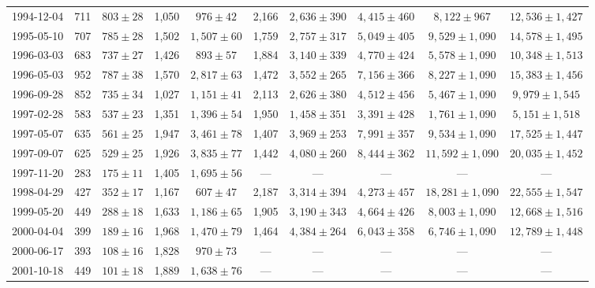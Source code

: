 \begin{landscape}
\begin{longtable}{cccccccccc}
{1994-12-04} & 711 & {$803  \pm  28$} & 1,050 & {$976 \pm 42$} & 2,166 & {$2,636 \pm 390$} & {$4,415 \pm 460$} & {$8,122 \pm 967$} & {$12,536 \pm 1,427$} \\
{1995-05-10} & 707 & {$785  \pm  28$} & 1,502 & {$1,507 \pm 60$} & 1,759 & {$2,757 \pm 317$} & {$5,049 \pm 405$} & {$9,529 \pm 1,090$} & {$14,578 \pm 1,495$} \\
{1996-03-03} & 683 & {$737  \pm  27$} & 1,426 & {$893 \pm 57$} & 1,884 & {$3,140 \pm 339$} & {$4,770 \pm 424$} & {$5,578 \pm 1,090$} & {$10,348 \pm 1,513$} \\
{1996-05-03} & 952 & {$787  \pm  38$} & 1,570 & {$2,817 \pm 63$} & 1,472 & {$3,552 \pm 265$} & {$7,156 \pm 366$} & {$8,227 \pm 1,090$} & {$15,383 \pm 1,456$} \\
{1996-09-28} & 852 & {$735  \pm  34$} & 1,027 & {$1,151 \pm 41$} & 2,113 & {$2,626 \pm 380$} & {$4,512 \pm 456$} & {$5,467 \pm 1,090$} & {$9,979 \pm 1,545$} \\
{1997-02-28} & 583 & {$537  \pm  23$} & 1,351 & {$1,396 \pm 54$} & 1,950 & {$1,458 \pm 351$} & {$3,391 \pm 428$} & {$1,761 \pm 1,090$} & {$5,151 \pm 1,518$} \\
{1997-05-07} & 635 & {$561  \pm  25$} & 1,947 & {$3,461 \pm 78$} & 1,407 & {$3,969 \pm 253$} & {$7,991 \pm 357$} & {$9,534 \pm 1,090$} & {$17,525 \pm 1,447$} \\
{1997-09-07} & 625 & {$529  \pm  25$} & 1,926 & {$3,835 \pm 77$} & 1,442 & {$4,080 \pm 260$} & {$8,444 \pm 362$} & {$11,592 \pm 1,090$} & {$20,035 \pm 1,452$} \\
{1997-11-20} & 283 & {$175  \pm  11$} & 1,405 & {$1,695 \pm 56$} & --- & --- & --- & --- & --- \\
{1998-04-29} & 427 & {$352  \pm  17$} & 1,167 & {$607 \pm 47$} & 2,187 & {$3,314 \pm 394$} & {$4,273 \pm 457$} & {$18,281 \pm 1,090$} & {$22,555 \pm 1,547$} \\
{1999-05-20} & 449 & {$288  \pm  18$} & 1,633 & {$1,186 \pm 65$} & 1,905 & {$3,190 \pm 343$} & {$4,664 \pm 426$} & {$8,003 \pm 1,090$} & {$12,668 \pm 1,516$} \\
{2000-04-04} & 399 & {$189  \pm  16$} & 1,968 & {$1,470 \pm 79$} & 1,464 & {$4,384 \pm 264$} & {$6,043 \pm 358$} & {$6,746 \pm 1,090$} & {$12,789 \pm 1,448$} \\
{2000-06-17} & 393 & {$108  \pm  16$} & 1,828 & {$970 \pm 73$} & --- & --- & --- & --- & --- \\
{2001-10-18} & 449 & {$101  \pm  18$} & 1,889 & {$1,638 \pm 76$} & --- & --- & --- & --- & --- \\

\end{longtable}
\end{landscape}
